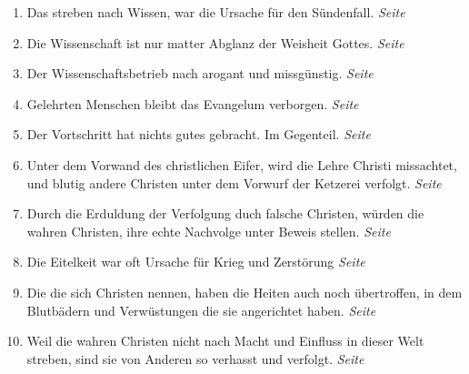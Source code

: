 \begin{enumerate}
 \item Das streben nach Wissen, war die Ursache für den Sündenfall. 
 \dotfill \textit{Seite \pageref{ref:07_03_wissen_erbsuende}}\\
 
 \item Die Wissenschaft ist nur matter Abglanz der Weisheit Gottes.
 \dotfill \textit{Seite \pageref{ref:07_03_wissen_erbsuende}}\\
 
 \item Der Wissenschaftsbetrieb nach arogant und missgünstig.
 \dotfill \textit{Seite \pageref{ref:07_06_wissenschaft}}\\
 
 \item Gelehrten Menschen bleibt das Evangelum verborgen.
 \dotfill \textit{Seite \pageref{ref:07_13_gelehrte}}\\
 
 \item Der Vortschritt hat nichts gutes gebracht. Im Gegenteil.
 \dotfill \textit{Seite \pageref{ref:07_14_vortschritt}}\\
 
 \item Unter dem Vorwand des christlichen Eifer, wird die Lehre Christi
missachtet, und blutig andere Christen unter dem Vorwurf der Ketzerei verfolgt.
 \dotfill \textit{Seite \pageref{ref:07_14_ketzer}}\\
 
 \item Durch die Erduldung der Verfolgung duch falsche Christen, würden die
wahren Christen, ihre echte Nachvolge unter Beweis stellen.
 \dotfill \textit{Seite \pageref{ref:07_16_vervolgung}}\\
 
 \item Die Eitelkeit war oft Ursache für Krieg und Zerstörung
 \dotfill \textit{Seite \pageref{ref:08_01_stolz}}\\
 
 \item Die die sich Christen nennen, haben die Heiten auch noch übertroffen, in
dem Blutbädern und Verwüstungen die sie angerichtet haben.
 \dotfill \textit{Seite \pageref{ref:08_06_heiden}}\\
 
 \item Weil die wahren Christen nicht nach Macht und Einfluss in dieser Welt
streben, sind sie von Anderen so verhasst und verfolgt.
 \dotfill \textit{Seite \pageref{ref:08_08_reich_gottes}}\\
 

\end{enumerate}
